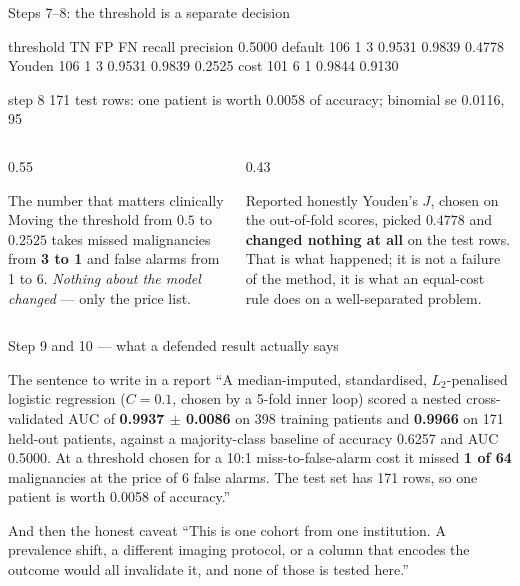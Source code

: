 \documentclass[aspectratio=169]{beamer}
\begin{document}
\begin{frame}[fragile,shrink=5]{Steps 7--8: the threshold is a separate decision}
\begin{outblk}
threshold           TN      FP      FN    recall  precision
0.5000 default     106       1       3    0.9531     0.9839
0.4778 Youden      106       1       3    0.9531     0.9839
0.2525 cost        101       6       1    0.9844     0.9130

step 8  171 test rows: one patient is worth 0.0058 of accuracy;
        binomial se 0.0116, 95%
\end{outblk}
  \begin{columns}[T]
    \begin{column}{0.55\textwidth}
      \begin{alertblock}{The number that matters clinically}
        Moving the threshold from $0.5$ to $0.2525$ takes missed
        malignancies from \textbf{3 to 1} and false alarms from 1 to 6.
        \emph{Nothing about the model changed} --- only the price list.
      \end{alertblock}
    \end{column}
    \begin{column}{0.43\textwidth}
      \begin{block}{Reported honestly}
        Youden's $J$, chosen on the out-of-fold scores, picked $0.4778$ and
        \textbf{changed nothing at all} on the test rows. That is what
        happened; it is not a failure of the method, it is what an
        equal-cost rule does on a well-separated problem.
      \end{block}
    \end{column}
  \end{columns}
\end{frame}

\begin{frame}[shrink=6]{Step 9 and 10 --- what a defended result actually says}
  \begin{block}{The sentence to write in a report}
    ``A median-imputed, standardised, $L_2$-penalised logistic regression
    ($C = 0.1$, chosen by a 5-fold inner loop) scored a nested
    cross-validated AUC of \textbf{0.9937 $\pm$ 0.0086} on 398 training
    patients and \textbf{0.9966} on 171 held-out patients, against a
    majority-class baseline of accuracy 0.6257 and AUC 0.5000. At a threshold
    chosen for a 10:1 miss-to-false-alarm cost it missed \textbf{1 of 64}
    malignancies at the price of 6 false alarms. The test set has 171 rows,
    so one patient is worth 0.0058 of accuracy.''
  \end{block}
  \begin{alertblock}{And then the honest caveat}
    ``This is one cohort from one institution. A prevalence shift, a
    different imaging protocol, or a column that encodes the outcome would
    all invalidate it, and none of those is tested here.''
  \end{alertblock}
\end{frame}
\end{document}
